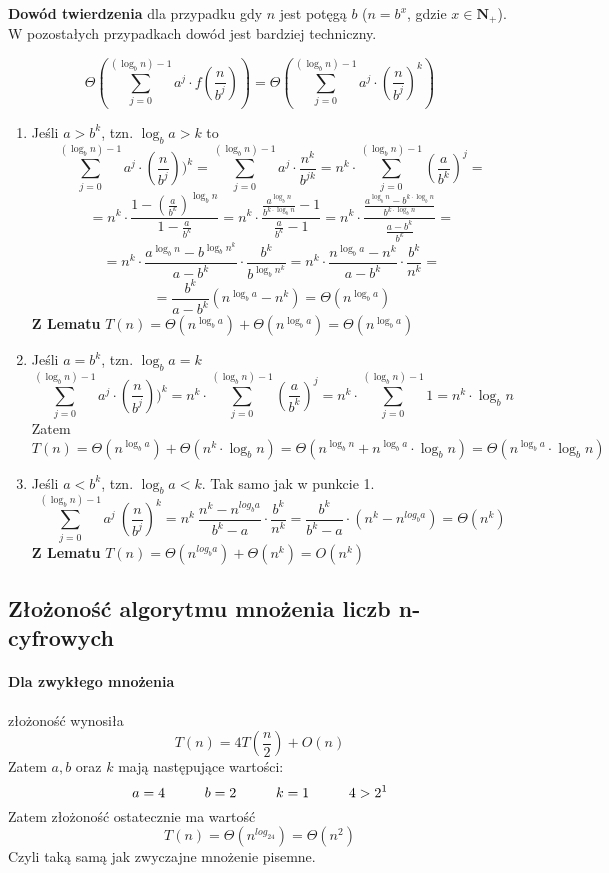 \textbf{Dowód twierdzenia} dla przypadku gdy $n$ jest potęgą $b$ ($n=b^x$, gdzie $x \in \mathbf{N}_+$). W pozostałych przypadkach dowód jest bardziej techniczny.

$$\Theta(\sum_{j=0}^{(\log_b n)-1} a^j \cdot f(\frac{n}{b^j}))=\Theta(\sum_{j=0}^{(\log_b n)-1} a^j\cdot (\frac{n}{b^j})^k)$$

\begin{enumerate}
\item Jeśli $a > b^k$, tzn. $\log_b a > k$ to
	$$ \sum_{j=0}^{(\log_b n)-1} a^j \cdot (\frac{n}{b^j}))^k 
	= \sum_{j=0}^{(\log_b n)-1} a^j \cdot \frac{n^k}{b^{jk}}
	= n^k \cdot \sum_{j=0}^{(\log_b n)-1} (\frac{a}{b^k})^j 
	=
	$$
	$$= n^k \cdot \frac{1-(\frac{a}{b^k})^{\log_b n}}{1-\frac{a}{b^k}} 
	= n^k \cdot \frac{\frac{a^{\log_b n}} {b^{k \cdot \log_b n}}-1}{\frac{a}{b^k}-1} 
	= n^k \cdot \frac{\frac{a^{\log_b n} - b^{k \cdot \log_b n}}{b^{k \cdot \log_b n}}}{\frac{a-b^k}{b^k}} 
	=
	$$
	$$
	= n^k \cdot \frac{a^{\log_b n} - b^{\log_b n^k}}{a - b^k} \cdot  \frac{b^k}{b^{\log_b n^k}}
	= n^k \cdot \frac{n^{\log_b a}-n^k}{a - b^k} \cdot \frac{b^k}{n^k} 
	=	
	$$
	$$	
	= \frac{b^k}{a-b^k}(n^{\log_b a}-n^k) 
	= \Theta(n^{\log_b a})$$
	\textbf{Z Lematu} $T(n) = \Theta(n^{\log_b a}) + \Theta(n^{\log_b a}) = \Theta(n^{\log_b a})$
\item Jeśli $a = b^k$, tzn. $\log_b a=k$
	$$	\sum_{j=0}^{(\log_b n)-1} a^j \cdot (\frac{n}{b^j}))^k 
	= n^k \cdot \sum_{j=0}^{(\log_b n)-1} (\frac{a}{b^k})^j 
	= n^k \cdot \sum_{j=0}^{(\log_b n)-1} 1 
	= n^k \cdot \log_b n
	$$
	Zatem 
	$$T(n) = \Theta(n^{\log_b a}) + \Theta(n^k \cdot \log_b n) 
	= \Theta(n^{\log_b n} + n^{\log_b a} \cdot \log_b n) 
	= \Theta(n^{\log_b a} \cdot \log_b n) $$
\item Jeśli $a<b^k$, tzn. $\log_b a<k$. Tak samo jak w punkcie 1.
	$$\sum_{j=0}^{(\log_b n)-1} a^j\ (\frac{n}{b^j})^k = n^k\ \frac{n^k-n^{log_ba}}{b^k-a} \cdot \frac{b^k}{n^k} = \frac{b^k}{b^k-a}\cdot (n^k - n^{log_ba})=\Theta(n^k)$$
	\textbf{Z Lematu} $T(n) = \Theta(n^{log_ba}) + \Theta(n^k) = O(n^k)$
\end{enumerate}

\subsection{Złożoność algorytmu mnożenia liczb n-cyfrowych}
\paragraph{Dla zwykłego mnożenia} złożoność wynosiła
	$$T(n) = 4T(\frac{n}{2}) + O(n)$$
Zatem $a,b$ oraz $k$ mają następujące wartości:
	$$a=4 \hspace*{1cm} b=2 \hspace*{1cm} k=1 \hspace*{1cm} 4>2^1$$
Zatem złożoność ostatecznie ma wartość
	$$T(n) = \Theta(n^{log_24})=\Theta(n^2)$$
Czyli taką samą jak zwyczajne mnożenie pisemne.


